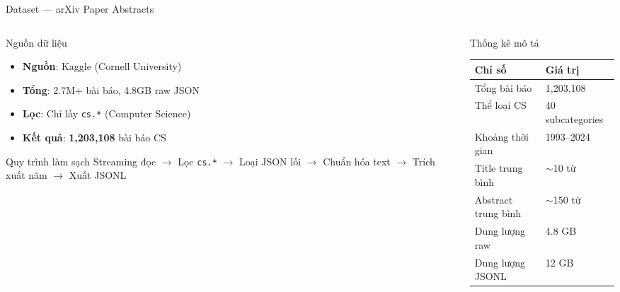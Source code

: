 \begin{frame}{Dataset --- arXiv Paper Abstracts}
\begin{columns}[T]
\begin{column}{0.50\textwidth}

\begin{block}{Nguồn dữ liệu}
{\small
\begin{itemize}\itemsep0pt \parskip0pt 
    \item \textbf{Nguồn}: Kaggle (Cornell University)
    \item \textbf{Tổng}: 2.7M+ bài báo, 4.8GB raw JSON
    \item \textbf{Lọc}: Chỉ lấy \texttt{cs.*} (Computer Science)
    \item \textbf{Kết quả}: \textcolor{accentTeal}{\textbf{1,203,108}} bài báo CS
\end{itemize}
}
\end{block}

\vspace{0.1cm}

\begin{exampleblock}{Quy trình làm sạch}
{\scriptsize
Streaming đọc $\to$ Lọc \texttt{cs.*} $\to$ Loại JSON lỗi $\to$ Chuẩn hóa text $\to$ Trích xuất năm $\to$ Xuất JSONL
}
\end{exampleblock}

\end{column}
\begin{column}{0.46\textwidth}

\begin{block}{Thống kê mô tả}
\centering
\renewcommand{\arraystretch}{1.0}
{\small
\begin{tabular}{l l}
\toprule
\textbf{Chỉ số} & \textbf{Giá trị} \\
\midrule
Tổng bài báo & 1,203,108 \\
Thể loại CS & 40 subcategories \\
Khoảng thời gian & 1993--2024 \\
Title trung bình & $\sim$10 từ \\
Abstract trung bình & $\sim$150 từ \\
Dung lượng raw & 4.8 GB \\
Dung lượng JSONL & 12 GB \\
\bottomrule
\end{tabular}
}
\end{block}

\end{column}
\end{columns}
\end{frame}

